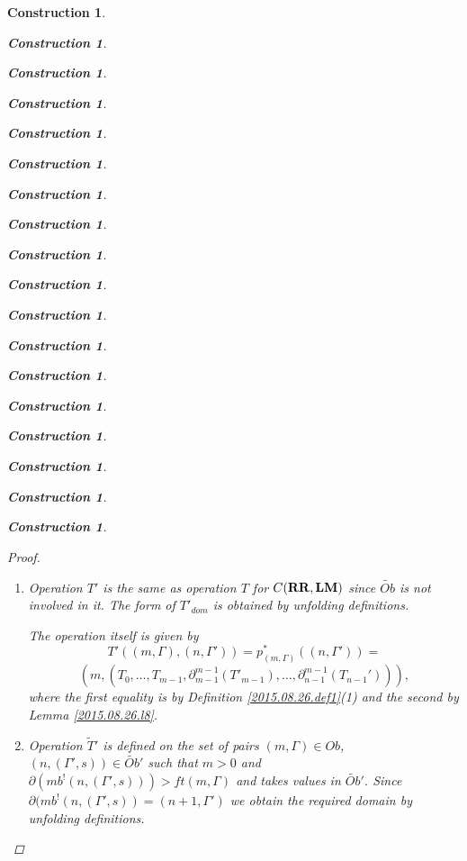 \documentclass[12pt]{amsart}
\newtheorem{construction}[proposition]{Construction}
\newcommand{\wt}{\widetilde}
\newcommand{\RR}{{\bf RR}}
\newcommand{\LM}{{\bf LM}}
\begin{document}
\begin{construction}
\begin{construction}
\begin{construction}
\begin{construction}
\begin{construction}
\begin{construction}
\begin{construction}
\begin{construction}
\begin{construction}
\begin{construction}
\begin{construction}
\begin{construction}
\begin{construction}
\begin{construction}
\begin{construction}
\begin{construction}
\begin{construction}
\begin{construction}
\begin{proof}
\begin{enumerate}
%
\item Operation $T'$ is the same as operation $T$ for $C(\RR,\LM)$ since
  $\wt{Ob}$ is not involved in it. The form of $T'_{dom}$ is obtained by
  unfolding definitions.

The operation itself is given by 
%
$$T'((m,\Gamma),(n,\Gamma'))=p_{(m,\Gamma)}^*((n,\Gamma'))=$$
$$(m,(T_0,\dots,T_{m-1},\partial_{m-1}^{m-1}(T'_{m-1}),\dots, \partial_{n-1}^{m-1}(T_{n-1}'))),$$
%
where the first equality is by Definition \ref{2015.08.26.def1}(1) and the second by Lemma \ref{2015.08.26.l8}. 
%
\item Operation $\wt{T}'$ is defined on the set of pairs $(m,\Gamma)\in Ob$,
  $(n,(\Gamma',s))\in \wt{Ob}'$ such that $m>0$ and
  $\partial(mb^!(n,(\Gamma',s)))>ft(m,\Gamma)$ and takes values in
  $\wt{Ob}'$. Since $\partial(mb^!(n,(\Gamma',s))=(n+1,\Gamma')$ we obtain the
  required domain by unfolding definitions.


\end{enumerate}
\end{proof}
\end{construction}
\end{construction}
\end{construction}
\end{construction}
\end{construction}
\end{construction}
\end{construction}
\end{construction}
\end{construction}
\end{construction}
\end{construction}
\end{construction}
\end{construction}
\end{construction}
\end{construction}
\end{construction}
\end{construction}
\end{construction}
\end{document}
